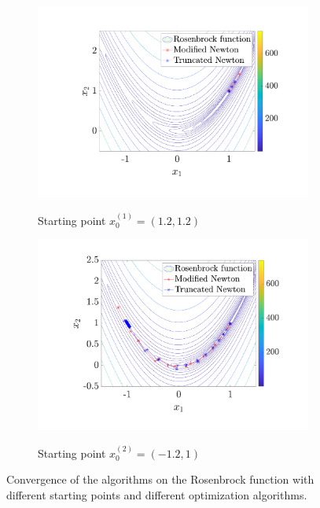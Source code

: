 \begin{figure}
    \centering
    \begin{subfigure}{0.49\textwidth}
        \centering
        \includegraphics[width=\linewidth]{figures/rosenbrock_x0_1.pdf}
        \label{fig:rosenbrock_x0_0}
        \caption{Starting point $x_0^{(1)} = (1.2, 1.2)$}
    \end{subfigure}
    \begin{subfigure}{0.49\textwidth}
        \centering
        \includegraphics[width=\linewidth]{figures/rosenbrock_x0_2.pdf}
        \label{fig:rosenbrock_x0_1}
        \caption{Starting point $x_0^{(2)} = (-1.2, 1)$}
    \end{subfigure}
    \caption{Convergence of the algorithms on the Rosenbrock function with different starting points and different optimization algorithms.}
    \label{fig:rosenbrock}
\end{figure}